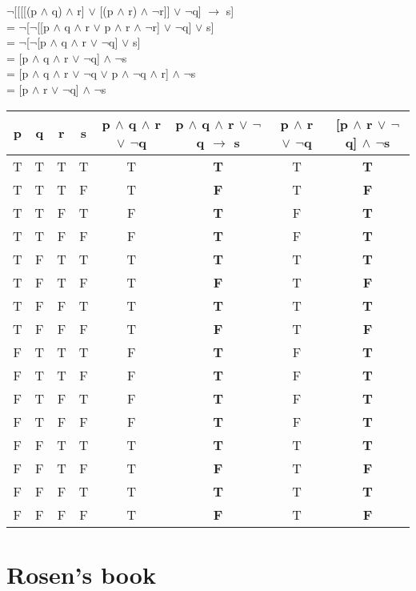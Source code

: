 \documentclass[12pt,en,a4paper]{article}
\begin{document}
	$\neg$[[[[(p $\wedge$ q) $\wedge$ r] $\vee$ [(p $\wedge$ r) $\wedge$ $\neg$r]] $\vee$ $\neg$q] $\rightarrow$ s]\\
	= $\neg$[$\neg$[[p $\wedge$ q $\wedge$ r $\vee$ p $\wedge$ r $\wedge$ $\neg$r] $\vee$ $\neg$q] $\vee$ s]\\
	= $\neg$[$\neg$[p $\wedge$ q $\wedge$ r $\vee$ $\neg$q] $\vee$ s]\\
	= [p $\wedge$ q $\wedge$ r $\vee$ $\neg$q] $\wedge$ $\neg$s\\
	= [p $\wedge$ q $\wedge$ r $\vee$ $\neg$q $\vee$ p $\wedge$ $\neg$q $\wedge$ r] $\wedge$ $\neg$s\\
	= [p $\wedge$ r $\vee$ $\neg$q] $\wedge$ $\neg$s\\	
	\begin{tabular}{|c|c|c|c|c|>{\bfseries}c|c|>{\bfseries}c|}
		\hline
		p & q & r & s & p $\wedge$ q $\wedge$ r $\vee$ $\neg$q & p $\wedge$ q $\wedge$ r $\vee$ $\neg$q $\rightarrow$ s & p $\wedge$ r $\vee$ $\neg$q & [p $\wedge$ r $\vee$ $\neg$q] $\wedge$ $\neg$s\\
		\hline
		T & T & T & T & T & T & T & T\\
		\hline
		T & T & T & F & T & F & T & F\\
		\hline
		T & T & F & T & F & T & F & T\\
		\hline
		T & T & F & F & F & T & F & T\\
		\hline
		T & F & T & T & T & T & T & T\\
		\hline
		T & F & T & F & T & F & T & F\\
		\hline
		T & F & F & T & T & T & T & T\\
		\hline
		T & F & F & F & T & F & T & F\\
		\hline
		F & T & T & T & F & T & F & T\\
		\hline
		F & T & T & F & F & T & F & T\\
		\hline
		F & T & F & T & F & T & F & T\\
		\hline
		F & T & F & F & F & T & F & T\\
		\hline
		F & F & T & T & T & T & T & T\\
		\hline
		F & F & T & F & T & F & T & F\\
		\hline
		F & F & F & T & T & T & T & T\\
		\hline
		F & F & F & F & T & F & T & F\\
		\hline
	\end{tabular}
\newpage
{}
	\section*{Rosen's book}
\end{document}

